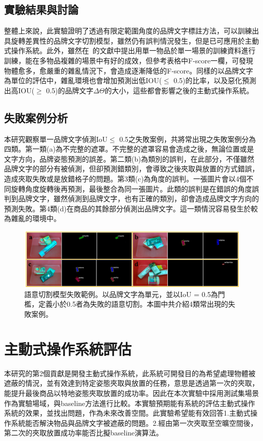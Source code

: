 \subsection{實驗結果與討論}
整體上來說，此實驗證明了透過有限定範圍角度的品牌文字標註方法，可以訓練出具旋轉差異性的品牌文字切割模型，雖然仍有誤判情況發生，但是已可應用於主動式操作系統。此外，雖然在~\cite{zeng2016multi}的文獻中提出用單一物品於單一場景的訓練資料進行訓練，能在多物品複雜的場景中有好的成效，但參考表格中F-score一欄，可發現物體愈多，愈嚴重的雜亂情況下，會造成逐漸降低的F-score。同樣的以品牌文字為單位的評估中，雜亂環境也會增加預測出低IOU($ \le$ 0.5)的比率，以及惡化預測出高IOU($ \ge$  0.5)的品牌文字$\Delta\Theta$的大小，這些都會影響之後的主動式操作系統。

\subsection{失敗案例分析}
本研究觀察單一品牌文字偵測IoU$ \le$ 0.5之失敗案例，共將常出現之失敗案例分為四類。第一類(a)為不完整的遮罩。不完整的遮罩容易會造成之後，無論位置或是文字方向，品牌姿態預測的誤差。第二類(b)為類別的誤判，在此部分，不僅雖然品牌文字的部分有被偵測，但卻預測錯類別，會導致之後夾取與放置的方式錯誤，造成夾取失敗或是放錯格子的問題。第3類(c)為角度的誤判。一張圖片會以4個不同旋轉角度旋轉後再預測，最後整合為同一張圖片。此類的誤判是在錯誤的角度誤判到品牌文字，雖然偵測到品牌文字，也有正確的類別，卻會造成品牌文字方向的預測失敗。第4類(d)在商品的其餘部分偵測出品牌文字。這一類情況容易發生於較為雜亂的環境中。





\begin{figure}[ht]
	\centering
	\includegraphics[height=!, width=1.0\linewidth, keepaspectratio=true]
	{./figures/failure_case.jpg}
  \caption{語意切割模型失敗範例。以品牌文字為單元，並以IoU = 0.5為門檻，定義小於0.5者為失敗的語意切割。本圖中共介紹4類常出現的失敗案例。}
  \label{figure:failure_case}
\end{figure}

\section{主動式操作系統評估}
本研究的第2個貢獻是開發主動式操作系統，此系統可開發目的為希望處理物體被遮蔽的情況，並有效達到特定姿態夾取與放置的任務，意思是透過第一次的夾取，能提升最後商品以特地姿態夾取放置的成功率。因此在本次實驗中採用測試集場景作為實驗場域，與baseline方法進行比較。本實驗預期能有系統的評估主動式操作系統的效果，並找出問題，作為未來改善空間。此實驗希望能有效回答1.主動式操作系統能否解決物品與品牌文字被遮蔽的問題。2.經由第一次夾取至空曠空間後，第二次的夾取放置成功率能否比擬baseline演算法。



